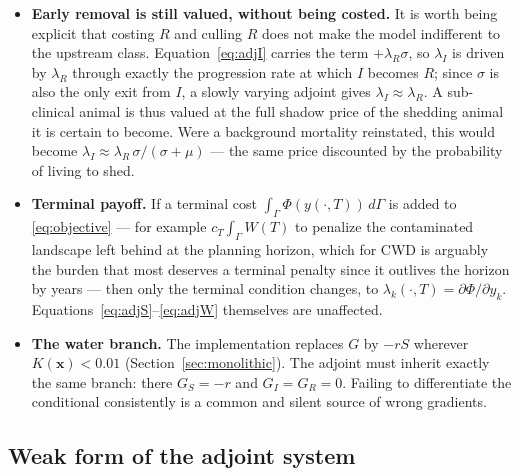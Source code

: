 \documentclass[11pt]{article}
\begin{document}
\begin{itemize}
\item \textbf{Early removal is still valued, without being costed.} It is worth being explicit that costing $R$ and culling $R$ does not make the model indifferent to the upstream class. Equation~\eqref{eq:adjI} carries the term $+\lambda_R\sigma$, so $\lambda_I$ is driven by $\lambda_R$ through exactly the progression rate at which $I$ becomes $R$; since $\sigma$ is also the only exit from $I$, a slowly varying adjoint gives $\lambda_I \approx \lambda_R$. A sub-clinical animal is thus valued at the full shadow price of the shedding animal it is certain to become. Were a background mortality reinstated, this would become $\lambda_I \approx \lambda_R\,\sigma/(\sigma+\mu)$ --- the same price discounted by the probability of living to shed.

\item \textbf{Terminal payoff.} If a terminal cost $\int_\Gamma \Phi(y(\cdot,T))\,d\Gamma$ is added to \eqref{eq:objective} --- for example $c_T\int_\Gamma W(T)$ to penalize the contaminated landscape left behind at the planning horizon, which for CWD is arguably the burden that most deserves a terminal penalty since it outlives the horizon by years --- then only the terminal condition changes, to $\lambda_k(\cdot,T) = \partial\Phi/\partial y_k$. Equations~\eqref{eq:adjS}--\eqref{eq:adjW} themselves are unaffected.

\item \textbf{The water branch.} The implementation replaces $G$ by $-rS$ wherever $K(\mathbf{x})<0.01$ (Section~\ref{sec:monolithic}). The adjoint must inherit exactly the same branch: there $G_S = -r$ and $G_I=G_R=0$. Failing to differentiate the conditional consistently is a common and silent source of wrong gradients.
\end{itemize}

\subsection{Weak form of the adjoint system}
\end{document}
